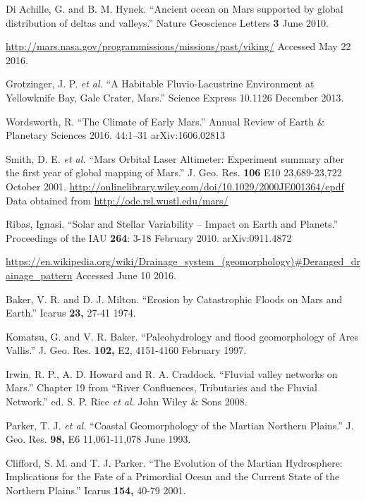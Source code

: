 \documentclass[12pt]{iopart}
\numberwithin{equation}{section}
\begin{document}
\begin{thebibliography}{9}

  Di Achille, G. and B. M. Hynek. ``Ancient ocean on Mars supported by global distribution of deltas and valleys.'' Nature Geoscience Letters {\bf 3} June 2010.

  \url{http://mars.nasa.gov/programmissions/missions/past/viking/} Accessed May 22 2016.

  Grotzinger, J. P. {\it et al.} ``A Habitable Fluvio-Lacustrine Environment at Yellowknife Bay, Gale Crater, Mars.'' Science Express 10.1126 December 2013.

  Wordsworth, R. ``The Climate of Early Mars.'' Annual Review of Earth \& Planetary Sciences 2016. 44:1–31 arXiv:1606.02813

  Smith, D. E. {\it et al.} ``Mars Orbital Laser Altimeter: Experiment summary after the first year of global mapping of Mars.'' J. Geo. Res. {\bf 106} E10 23,689-23,722 October 2001. \url{http://onlinelibrary.wiley.com/doi/10.1029/2000JE001364/epdf} 
  Data obtained from \url{http://ode.rsl.wustl.edu/mars/}

  Ribas, Ignasi. ``Solar and Stellar Variability -- Impact on Earth and Planets.'' Proceedings of the IAU {\bf 264}: 3-18 February 2010. arXiv:0911.4872 

  \url{https://en.wikipedia.org/wiki/Drainage_system_(geomorphology)#Deranged_drainage_pattern} Accessed June 10 2016.

  Baker, V. R. and D. J. Milton. ``Erosion by Catastrophic Floods on Mars and Earth.'' Icarus {\bf 23,} 27-41 1974.

  Komatsu, G. and V. R. Baker. ``Paleohydrology and flood geomorphology of Ares Vallis.'' J. Geo. Res. {\bf 102,} E2, 4151-4160 February 1997.

  Irwin, R. P., A. D. Howard and R. A. Craddock. ``Fluvial valley networks on Mars.'' Chapter 19 from ``River Confluences, Tributaries and the Fluvial Network.'' ed. S. P. Rice {\it et al.} John Wiley \& Sons 2008.

  Parker, T. J. {\it et al.} ``Coastal Geomorphology of the Martian Northern Plains.'' J. Geo. Res. {\bf 98,} E6 11,061-11,078 June 1993.

  Clifford, S. M. and T. J. Parker. ``The Evolution of the Martian Hydrosphere: Implications for the Fate of a Primordial Ocean and the Current State of the Northern Plains.'' Icarus {\bf 154,} 40-79 2001. 


\end{thebibliography}
\end{document}
